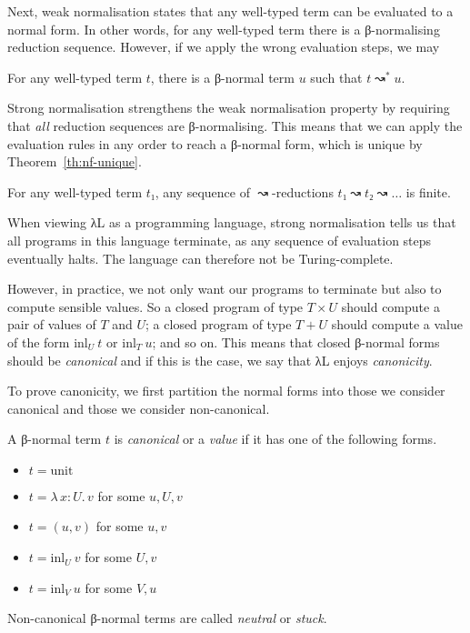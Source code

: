 \documentclass{article}
\theoremstyle{definition}
\newcommand{\Lam}[2]{λ\,#1.\, #2}
\newcommand{\unit}{\mathrm{unit}}
\newcommand{\inl}{\ensuremath{\mathrm{inl}}}
\begin{document}
Next, weak normalisation states that any well-typed term can be evaluated to a normal form.
In other words, for any well-typed term there is a β-normalising reduction sequence.
However, if we apply the wrong evaluation steps, we may

\begin{theorem}\label{th:wn}
  For any well-typed term $t$, there is a β-normal term $u$ such that $t ↝^{*} u$.
\end{theorem}

Strong normalisation strengthens the weak normalisation property by requiring that \emph{all} reduction sequences are β-normalising.
This means that we can apply the evaluation rules in any order to reach a β-normal form, which is unique by Theorem~\ref{th:nf-unique}.

\begin{theorem}\label{th:sn}
  For any well-typed term $t₁$, any sequence of $↝$-reductions $t₁ ↝ t₂ ↝ \dots$ is finite.
\end{theorem}

When viewing λL as a programming language, strong normalisation tells us that all programs in this language terminate, as any sequence of evaluation steps eventually halts.
The language can therefore not be Turing-complete.

However, in practice, we not only want our programs to terminate but also to compute sensible values.
So a closed program of type $T × U$ should compute a pair of values of $T$ and $U$; a closed program of type $T + U$ should compute a value of the form $\inl_{U}~t$ or $\inl_{T}~u$; and so on.
This means that closed β-normal forms should be \emph{canonical} and if this is the case, we say that λL enjoys \emph{canonicity}.

To prove canonicity, we first partition the normal forms into those we consider canonical and those we consider non-canonical.

\begin{definition}[Values]
  A β-normal term $t$ is \emph{canonical} or a \emph{value} if it has one of the following forms.
  \begin{itemize}
    \item $t = \unit$
    \item $t = \Lam{x : U}{v}$ for some $u, U, v$
    \item $t = (u, v)$ for some $u, v$
    \item $t = \inl_{U}~v$ for some $U, v$
    \item $t = \inl_{V}~u$ for some $V, u$
  \end{itemize}
  Non-canonical β-normal terms are called \emph{neutral} or \emph{stuck}.
\end{definition}
\end{document}
